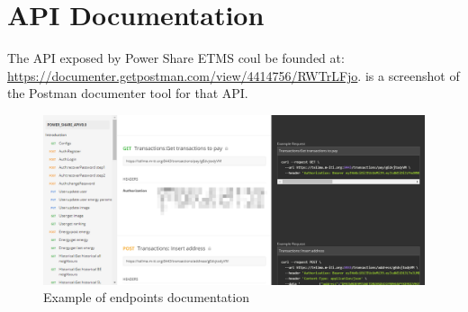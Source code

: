 \chapter{\ac{API} Documentation}
\label{chapter:appendixA}

The \ac{API} exposed by Power Share \ac{ETMS} coul be founded at: \url{ https://documenter.getpostman.com/view/4414756/RWTrLFjo}.  is a screenshot of the Postman documenter tool for that \ac{API}.

\begin{figure}[h]
\centering
\includegraphics[width=1\textwidth]{./Images/api}
\caption{Example of endpoints documentation}
\label{fig:api}
\end{figure}